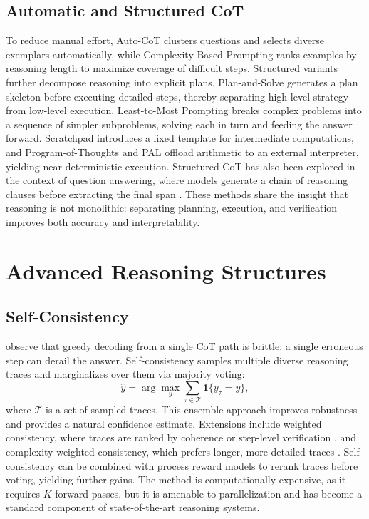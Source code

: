 \documentclass[11pt,a4paper]{article}
\begin{document}
\subsection{Automatic and Structured CoT}
To reduce manual effort, Auto-CoT \citep{zhang2022automatic} clusters questions and selects diverse exemplars automatically, while Complexity-Based Prompting \citep{fu2022complexity} ranks examples by reasoning length to maximize coverage of difficult steps. Structured variants further decompose reasoning into explicit plans. Plan-and-Solve \citep{wang2023plan} generates a plan skeleton before executing detailed steps, thereby separating high-level strategy from low-level execution. Least-to-Most Prompting \citep{zhou2022least} breaks complex problems into a sequence of simpler subproblems, solving each in turn and feeding the answer forward. Scratchpad \citep{nyre2021scratchpad} introduces a fixed template for intermediate computations, and Program-of-Thoughts \citep{chen2022program} and PAL \citep{gao2023pal} offload arithmetic to an external interpreter, yielding near-deterministic execution. Structured CoT has also been explored in the context of question answering, where models generate a chain of reasoning clauses before extracting the final span \citep{li2023structured}. These methods share the insight that reasoning is not monolithic: separating planning, execution, and verification improves both accuracy and interpretability.

\section{Advanced Reasoning Structures}
\label{sec:advanced}
\subsection{Self-Consistency}
\citet{wang2022self} observe that greedy decoding from a single CoT path is brittle: a single erroneous step can derail the answer. Self-consistency samples multiple diverse reasoning traces and marginalizes over them via majority voting:
\begin{equation}
\hat{y} = \arg\max_{y} \sum_{\tau \in \mathcal{T}} \mathbf{1}\{y_\tau = y\},
\end{equation}
where $\mathcal{T}$ is a set of sampled traces. This ensemble approach improves robustness and provides a natural confidence estimate. Extensions include weighted consistency, where traces are ranked by coherence or step-level verification \citep{lightman2023let}, and complexity-weighted consistency, which prefers longer, more detailed traces \citep{fu2022complexity}. Self-consistency can be combined with process reward models to rerank traces before voting, yielding further gains. The method is computationally expensive, as it requires $K$ forward passes, but it is amenable to parallelization and has become a standard component of state-of-the-art reasoning systems.
\end{document}
